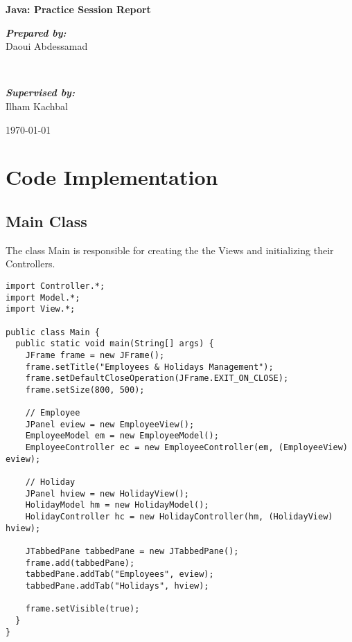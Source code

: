 \documentclass[12pt]{article}
\begin{document}
\begin{titlepage}
    \thispagestyle{empty}

        \vspace*{2cm}
        \Huge\textbf{\textcolor{centrale_red}{Java: Practice Session Report}} \\
        \vspace{1cm}
    
        \begin{minipage}{0.4\textwidth}
                \begin{flushleft} \large
                    \emph{\textbf{Prepared by:}}\\ 
                    Daoui Abdessamad
                \end{flushleft}
            \end{minipage}
            ~
            \begin{minipage}{0.4\textwidth}
                \begin{flushright} \large
					\emph{\textbf{Supervised by:}}\\
                     Ilham Kachbal
                \end{flushright}
            \end{minipage}

        \vfill
        \large{\today}
\end{titlepage}

\newpage

\tableofcontents

\newpage

\section{Code Implementation}

\subsection{Main Class}

The class Main is responsible for creating the the Views
and initializing their Controllers.

\begin{lstlisting}
import Controller.*;
import Model.*;
import View.*;

public class Main {
  public static void main(String[] args) {
    JFrame frame = new JFrame();
    frame.setTitle("Employees & Holidays Management");
    frame.setDefaultCloseOperation(JFrame.EXIT_ON_CLOSE);
    frame.setSize(800, 500);

    // Employee
    JPanel eview = new EmployeeView();
    EmployeeModel em = new EmployeeModel();
    EmployeeController ec = new EmployeeController(em, (EmployeeView) eview);

    // Holiday
    JPanel hview = new HolidayView();
    HolidayModel hm = new HolidayModel();
    HolidayController hc = new HolidayController(hm, (HolidayView) hview);

    JTabbedPane tabbedPane = new JTabbedPane();
    frame.add(tabbedPane);
    tabbedPane.addTab("Employees", eview);
    tabbedPane.addTab("Holidays", hview);

    frame.setVisible(true);
  }
}
\end{lstlisting}
\end{document}
